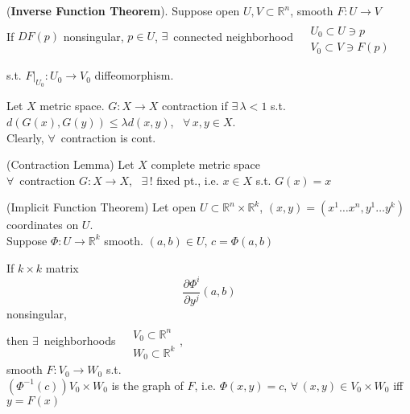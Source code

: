 \begin{theorem}[7.6] (\textbf{Inverse Function Theorem}). Suppose open $U,V \subset \mathbb{R}^n$, smooth $F: U \to V$ \\
If $DF(p)$ nonsingular, $p \in U$, $\exists \, $ connected neighborhood $\begin{aligned} & \quad \\ & U_0 \subset U \ni p \\ & V_0 \subset V \ni F(p) \end{aligned}$

s.t. $\left. F \right|_{U_0} : U_0 \to V_0$ diffeomorphism.  
\end{theorem}

Let $X$ metric space.  $G:X \to X$ contraction if $\exists \, \lambda <1$ s.t. $d(G(x), G(y)) \leq \lambda d(x,y)$, \, $\forall \, x, y \in X$.  \\
Clearly, $\forall \, $ contraction is cont.  

\begin{lemma}[7.7] (Contraction Lemma)
Let $X$ complete metric space \\
$\forall \,$ contraction $G: X \to X$, \, $\exists \, !$ fixed pt., i.e. $x\in X$ s.t. $G(x) = x$
\end{lemma}

\begin{theorem}[7.9] (Implicit Function Theorem)
  Let open $U \subset \mathbb{R}^n \times \mathbb{R}^k$, $(x,y) = (x^1 \dots x^n, y^1 \dots y^k)$ coordinates on $U$.  \\

Suppose $\Phi : U \to \mathbb{R}^k$ smooth.  $(a,b) \in U$, $c = \Phi(a,b)$

If $k\times k$ matrix 
\[
\frac{ \partial \Phi^i }{ \partial y^j }(a,b)
\]
nonsingular, \\
then $\exists \, $ neighborhoods $\begin{aligned} & \quad \\ 
  & V_0 \subset \mathbb{R}^n \\ 
  & W_0 \subset \mathbb{R}^k \end{aligned}$,  \\
smooth $F: V_0 \to W_0$ s.t. \\
$(\Phi^{-1}(c) ) V_0 \times W_0$ is the graph of $F$, i.e. $\Phi(x,y) = c$, $\forall \, (x,y) \in V_0 \times W_0$ iff $y= F(x)$


\end{theorem}



